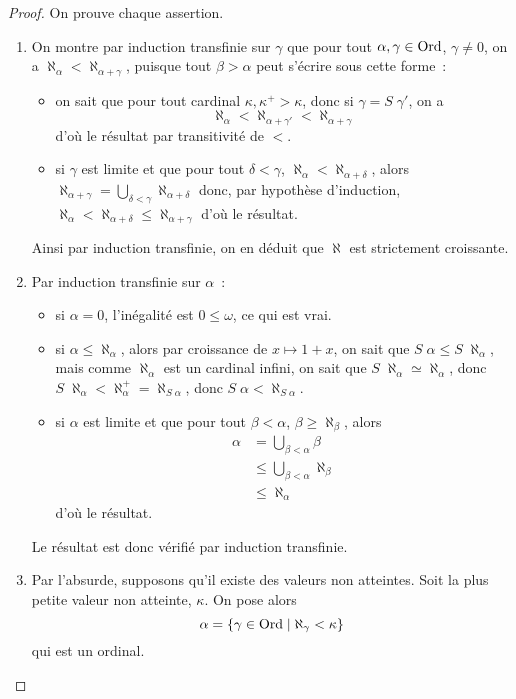\begin{proof}
  On prouve chaque assertion.
  \begin{enumerate}[label=(\roman*)]
  \item On montre par induction transfinie sur $\gamma$ que pour tout
    $\alpha,\gamma \in \operatorname{Ord}$, $\gamma\neq 0$, on a
    $\aleph_{\alpha} < \aleph_{\alpha + \gamma}$, puisque tout $\beta > \alpha$ peut
    s'écrire sous cette forme~:
    \begin{itemize}
    \item on sait que pour tout cardinal $\kappa, \kappa^+ > \kappa$, donc si
      $\gamma = S\;\gamma'$, on a
      \[\aleph_{\alpha} < \aleph_{\alpha + \gamma'}
      < \aleph_{\alpha + \gamma}\]
      d'où le résultat par transitivité de $<$.
    \item si $\gamma$ est limite et que pour tout $\delta < \gamma$,
      $\aleph_{\alpha} < \aleph_{\alpha + \delta}$, alors
      $\aleph_{\alpha + \gamma} = \bigcup_{\delta < \gamma} \aleph_{\alpha + \delta}$
      donc, par hypothèse d'induction,
      $\aleph_{\alpha} < \aleph_{\alpha + \delta} \leq \aleph_{\alpha + \gamma}$
      d'où le résultat.
    \end{itemize}
    Ainsi par induction transfinie, on en déduit que $\aleph$ est strictement
    croissante.
  \item Par induction transfinie sur $\alpha$~:
    \begin{itemize}
    \item si $\alpha = 0$, l'inégalité est $0\leq \omega$, ce qui est vrai.
    \item si $\alpha \leq \aleph_\alpha$, alors par croissance de
      $x\mapsto 1+x$, on sait que $S\;\alpha \leq S\;\aleph_\alpha$, mais
      comme $\aleph_\alpha$ est un cardinal infini, on sait que
      $S\;\aleph_\alpha \simeq \aleph_\alpha$, donc
      $S\;\aleph_\alpha < \aleph_\alpha^+ = \aleph_{S\;\alpha}$, donc
      $S\;\alpha < \aleph_{S\;\alpha}$.
    \item si $\alpha$ est limite et que pour tout $\beta < \alpha$,
      $\beta \geq \aleph_\beta$, alors
      \begin{align*}
        \alpha &= \bigcup_{\beta < \alpha} \beta\\
        &\leq \bigcup_{\beta < \alpha} \aleph_\beta\\
        &\leq \aleph_\alpha
      \end{align*}
      d'où le résultat.
    \end{itemize}
    Le résultat est donc vérifié par induction transfinie.
  \item Par l'absurde, supposons qu'il existe des valeurs non atteintes. Soit la
    plus petite valeur non atteinte, $\kappa$. On pose alors
    \[\alpha = \{\gamma \in \operatorname{Ord} \mid \aleph_\gamma < \kappa\}\]
    qui est un ordinal.
    

\end{enumerate}
\end{proof}
